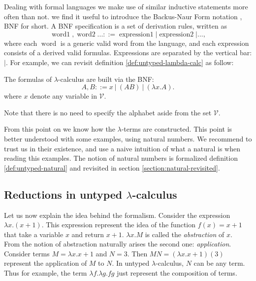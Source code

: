 Dealing with formal languages we make use of similar inductive statements more often than not. we find it useful to introduce the Backus-Naur Form notation \cite{knuth1964backus}, BNF for short.  A BNF specification is a set of derivation rules, written as
$$\operatorname{word1}, \operatorname{word2} ... ::= \operatorname{expression1} | \operatorname{expression2} |...,$$
where each $\operatorname{word}$ is a generic valid word from the language, and each  expression consists of a derived valid formulas. Expressions are separated by the vertical bar: $|$. For example, we can revisit definition \ref{def:untyped-lambda-calc} as follow:

\begin{definition}
  The formulas of  $\lambda$-calculus are built via the BNF:
  $$A,B ::= x\ |\ (AB)\ |\ (\lambda x.A) .$$
  where $x$ denote any variable in $\mathcal{V}$.
\end{definition}
\begin{remark}
  Note that there is no need to specify the alphabet aside from the set $\mathcal{V}$.
\end{remark}

From this point on we know how the $\lambda$-terms are constructed. This point is better understood with some examples, using natural numbers.  We recommend to trust us in their existence, and use a naive intuition of what a natural is when  reading this examples. The notion of natural numbers is formalized definition \ref{def:untyped-natural} and revisited in section \ref{section:natural-revisited}.\\

\subsection{Reductions in untyped $\lambda$-calculus}
Let us now explain the idea behind the formalism. Consider the expression $\lambda x.(x+1)$. This expression represent the idea of the function $f(x)=x+1$ that take a variable $x$ and return $x+1$. $\lambda x.M$ is called the \emph{abstraction} of $x$.\\

From the notion of abstraction naturally arises the second one: \emph{application}. Consider terms $M  =\lambda x. x+1$ and $N = 3$. Then $MN = (\lambda x. x+1)(3)$ represent the application of $M$ to $N$. In untyped $\lambda$-calculus, $N$ can be any term. Thus for example, the term $\lambda f.\lambda g. fg$ just represent the composition of terms.   

